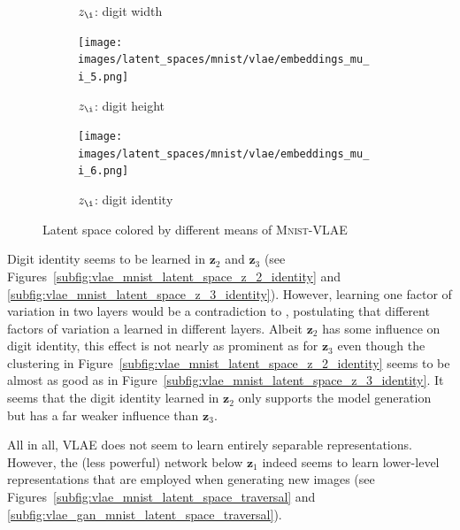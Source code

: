 \begin{landscape}
\begin{figure}
{\begin{adjustbox}{valign=T}
\begin{subfigure}{.19\textwidth}
                \caption{$z_{\i}$: digit width}
                \label{subfig:vlae_mnist_latent_space_z_\i_width}
            \end{subfigure}
        \end{adjustbox}
        \hfill
        \begin{adjustbox}{valign=T}
            \begin{subfigure}{.19\textwidth}
                \texttt{[image: images/latent\_spaces/mnist/vlae/embeddings\_mu\_\\i\_5.png]}
                \caption{$z_{\i}$: digit height}
                \label{subfig:vlae_mnist_latent_space_z_\i_height}
            \end{subfigure}
        \end{adjustbox}
        \hfill
        \begin{adjustbox}{valign=T}
            \begin{subfigure}{.19\textwidth}
                \texttt{[image: images/latent\_spaces/mnist/vlae/embeddings\_mu\_\\i\_6.png]}
                \caption{$z_{\i}$: digit identity}
                \label{subfig:vlae_mnist_latent_space_z_\i_identity}
            \end{subfigure}
        \end{adjustbox}}
        \caption[\textsc{Mnist}-VLAE Latent Space]{Latent space colored by different means of \textsc{Mnist}-\ac{VLAE}}
        \label{fig:vlae_latent_space_mnist}
    \end{figure}
\end{landscape}

Digit identity seems to be learned in $\bm{z}_2$ and $\bm{z}_3$ (see Figures~\ref{subfig:vlae_mnist_latent_space_z_2_identity} and \ref{subfig:vlae_mnist_latent_space_z_3_identity}).
However, learning one factor of variation in two layers would be a contradiction to \citep{zhao2017learning}, postulating that different factors of variation a learned in different layers.
Albeit $\bm{z}_2$ has some influence on digit identity, this effect is not nearly as prominent as for $\bm{z}_3$ even though the clustering in Figure~\ref{subfig:vlae_mnist_latent_space_z_2_identity} seems to be almost as good as in Figure~\ref{subfig:vlae_mnist_latent_space_z_3_identity}.
It seems that the digit identity learned in $\bm{z}_2$ only supports the model generation but has a far weaker influence than $\bm{z}_3$.

All in all, \ac{VLAE} does not seem to learn entirely separable representations.
However, the (less powerful) network below $\bm{z}_1$ indeed seems to learn lower-level representations that are employed when generating new images (see Figures~\ref{subfig:vlae_mnist_latent_space_traversal} and \ref{subfig:vlae_gan_mnist_latent_space_traversal}).

